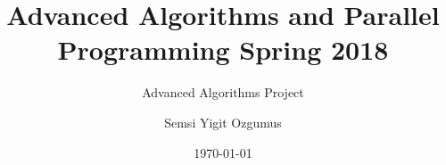 \documentclass{beamer}
\title{Advanced Algorithms and Parallel Programming Spring 2018}
\subtitle{Advanced Algorithms Project}
\author{Semsi Yigit Ozgumus}
\institute{Bogazici University}
\date{\today}
\begin{document}
	\begin{frame}
	\titlepage
\end{frame}
\end{document}
